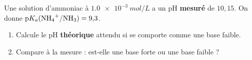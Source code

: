 \documentclass[11pt,a4paper]{article}
\begin{document}
\begin{exo}
Une solution d'ammoniac  à $\qty{1,0e-3}{mol\per L}$ a un pH \textbf{mesuré} de $10{,}15$. On donne
$\mathrm{p}K_a(\ce{NH4+/NH3}) = 9{,}3$.
\begin{enumerate}[label=\alph*)]
  \item Calcule le pH \textbf{théorique} attendu si  se comporte comme une base faible.
  \item Compare à la mesure :  est-elle une base forte ou une base faible ?
\end{enumerate}
\end{exo}
\end{document}
